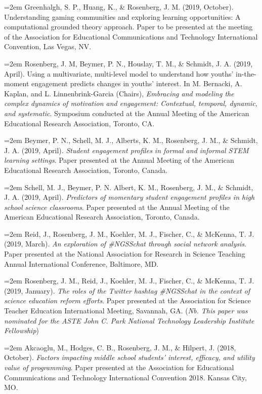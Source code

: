 \documentclass[14,]{article}
\begin{document}
\hangindent=2em Greenhalgh, S. P., Huang, K., \& Rosenberg, J. M. (2019,
October). Understanding gaming communities and exploring learning
opportunities: A computational grounded theory approach. Paper to be
presented at the meeting of the Association for Educational
Communications and Technology International Convention, Las Vegas, NV.

\hangindent=2em Rosenberg, J. M, Beymer, P. N., Houslay, T. M., \&
Schmidt, J. A. (2019, April). Using a multivariate, multi-level model to
understand how youths' in-the-moment engagement predicts changes in
youths' interest. In M. Bernacki, A. Kaplan, and L. Linnenbrink-Garcia
(Chairs), \emph{Embracing and modeling the complex dynamics of
motivation and engagement: Contextual, temporal, dynamic, and
systematic}. Symposium conducted at the Annual Meeting of the American
Educational Research Association, Toronto, CA.

\hangindent=2em Beymer, P. N., Schell, M. J., Alberts, K. M., Rosenberg,
J. M., \& Schmidt, J. A. (2019, April). \emph{Student engagement
profiles in formal and informal STEM learning settings}. Paper presented
at the Annual Meeting of the American Educational Research Association,
Toronto, Canada.

\hangindent=2em Schell, M. J., Beymer, P. N. Albert, K. M., Rosenberg,
J. M., \& Schmidt, J. A. (2019, April). \emph{Predictors of momentary
student engagement profiles in high school science classrooms}. Paper
presented at the Annual Meeting of the American Educational Research
Association, Toronto, Canada.

\hangindent=2em Reid, J., Rosenberg, J. M., Koehler, M. J., Fischer, C.,
\& McKenna, T. J. (2019, March). \emph{An exploration of \#NGSSchat
through social network analysis}. Paper presented at the National
Association for Research in Science Teaching Annual International
Conference, Baltimore, MD.

\hangindent=2em Rosenberg, J. M., Reid, J., Koehler, M. J., Fischer, C.,
\& McKenna, T. J. (2019, January). \emph{The roles of the Twitter
hashtag \#NGSSchat in the context of science education reform efforts}.
Paper presented at the Association for Science Teacher Education
International Meeting, Savannah, GA. (\emph{Nb. This paper was nominated
for the ASTE John C. Park National Technology Leadership Institute
Fellowship})

\hangindent=2em Akcaoglu, M., Hodges, C. B., Rosenberg, J. M., \&
Hilpert, J. (2018, October). \emph{Factors impacting middle school
students' interest, efficacy, and utility value of programming}. Paper
presented at the Association for Educational Communications and
Technology International Convention 2018. Kansas City, MO.
\end{document}
